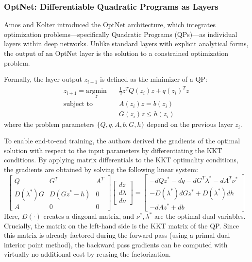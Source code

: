 \documentclass{article}
\begin{document}
\subsubsection{OptNet: Differentiable Quadratic Programs as Layers}

Amos and Kolter \cite{amos2017optnet} introduced the OptNet architecture, which integrates optimization problems—specifically Quadratic Programs (QPs)—as individual layers within deep networks. Unlike standard layers with explicit analytical forms, the output of an OptNet layer is the solution to a constrained optimization problem.

Formally, the layer output $z_{i+1}$ is defined as the minimizer of a QP:
\begin{align}
  z_{i+1} = \underset{z}{\text{argmin}} \quad & \frac{1}{2}z^T Q(z_i) z + q(z_i)^T z \nonumber \\
  \text{subject to} \quad & A(z_i) z = b(z_i) \nonumber \\
  & G(z_i) z \leq h(z_i)
\end{align}
where the problem parameters $\{Q, q, A, b, G, h\}$ depend on the previous layer $z_i$.

To enable end-to-end training, the authors derived the gradients of the optimal solution with respect to the input parameters by differentiating the KKT conditions. By applying matrix differentials to the KKT optimality conditions, the gradients are obtained by solving the following linear system:
\begin{equation}
  \begin{bmatrix}
    Q & G^T & A^T \\
    D(\lambda^*)G & D(Gz^* - h) & 0 \\
    A & 0 & 0
  \end{bmatrix}
  \begin{bmatrix}
    dz \\ d\lambda \\ d\nu
  \end{bmatrix}
  =
  \begin{bmatrix}
    -dQ z^* - dq - dG^T \lambda^* - dA^T \nu^* \\
    -D(\lambda^*) dG z^* + D(\lambda^*) dh \\
    -dA z^* + db
  \end{bmatrix}
\end{equation}
Here, $D(\cdot)$ creates a diagonal matrix, and $\nu^*, \lambda^*$ are the optimal dual variables. Crucially, the matrix on the left-hand side is the KKT matrix of the QP. Since this matrix is already factored during the forward pass (using a primal-dual interior point method), the backward pass gradients can be computed with virtually no additional cost by reusing the factorization.
\end{document}
